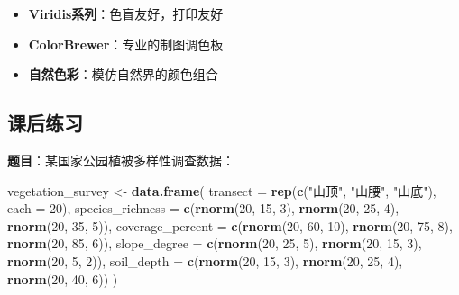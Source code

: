 \documentclass[
  twoside]{book}
\newenvironment{Shaded}{\begin{snugshade}}{\end{snugshade}}
\newcommand{\AttributeTok}[1]{\textcolor[rgb]{0.13,0.29,0.53}{#1}}
\newcommand{\DecValTok}[1]{\textcolor[rgb]{0.00,0.00,0.81}{#1}}
\newcommand{\FunctionTok}[1]{\textcolor[rgb]{0.13,0.29,0.53}{\textbf{#1}}}
\newcommand{\NormalTok}[1]{#1}
\newcommand{\OtherTok}[1]{\textcolor[rgb]{0.56,0.35,0.01}{#1}}
\newcommand{\StringTok}[1]{\textcolor[rgb]{0.31,0.60,0.02}{#1}}
\providecommand{\tightlist}{%
  \setlength{\itemsep}{0pt}\setlength{\parskip}{0pt}}
\begin{document}
\begin{itemize}
\tightlist
\item
  \textbf{Viridis系列}：色盲友好，打印友好
\item
  \textbf{ColorBrewer}：专业的制图调色板
\item
  \textbf{自然色彩}：模仿自然界的颜色组合
\end{itemize}

\hypertarget{ux8bfeux540eux7ec3ux4e60-9}{%
\subsection{课后练习}\label{ux8bfeux540eux7ec3ux4e60-9}}

\textbf{题目}：某国家公园植被多样性调查数据：

\begin{Shaded}
\begin{Highlighting}[]
\NormalTok{vegetation\_survey }\OtherTok{\textless{}{-}} \FunctionTok{data.frame}\NormalTok{(}
  \AttributeTok{transect =} \FunctionTok{rep}\NormalTok{(}\FunctionTok{c}\NormalTok{(}\StringTok{"山顶"}\NormalTok{, }\StringTok{"山腰"}\NormalTok{, }\StringTok{"山底"}\NormalTok{), }\AttributeTok{each =} \DecValTok{20}\NormalTok{),}
  \AttributeTok{species\_richness =} \FunctionTok{c}\NormalTok{(}\FunctionTok{rnorm}\NormalTok{(}\DecValTok{20}\NormalTok{, }\DecValTok{15}\NormalTok{, }\DecValTok{3}\NormalTok{), }\FunctionTok{rnorm}\NormalTok{(}\DecValTok{20}\NormalTok{, }\DecValTok{25}\NormalTok{, }\DecValTok{4}\NormalTok{), }\FunctionTok{rnorm}\NormalTok{(}\DecValTok{20}\NormalTok{, }\DecValTok{35}\NormalTok{, }\DecValTok{5}\NormalTok{)),}
  \AttributeTok{coverage\_percent =} \FunctionTok{c}\NormalTok{(}\FunctionTok{rnorm}\NormalTok{(}\DecValTok{20}\NormalTok{, }\DecValTok{60}\NormalTok{, }\DecValTok{10}\NormalTok{), }\FunctionTok{rnorm}\NormalTok{(}\DecValTok{20}\NormalTok{, }\DecValTok{75}\NormalTok{, }\DecValTok{8}\NormalTok{), }\FunctionTok{rnorm}\NormalTok{(}\DecValTok{20}\NormalTok{, }\DecValTok{85}\NormalTok{, }\DecValTok{6}\NormalTok{)),}
  \AttributeTok{slope\_degree =} \FunctionTok{c}\NormalTok{(}\FunctionTok{rnorm}\NormalTok{(}\DecValTok{20}\NormalTok{, }\DecValTok{25}\NormalTok{, }\DecValTok{5}\NormalTok{), }\FunctionTok{rnorm}\NormalTok{(}\DecValTok{20}\NormalTok{, }\DecValTok{15}\NormalTok{, }\DecValTok{3}\NormalTok{), }\FunctionTok{rnorm}\NormalTok{(}\DecValTok{20}\NormalTok{, }\DecValTok{5}\NormalTok{, }\DecValTok{2}\NormalTok{)),}
  \AttributeTok{soil\_depth =} \FunctionTok{c}\NormalTok{(}\FunctionTok{rnorm}\NormalTok{(}\DecValTok{20}\NormalTok{, }\DecValTok{15}\NormalTok{, }\DecValTok{3}\NormalTok{), }\FunctionTok{rnorm}\NormalTok{(}\DecValTok{20}\NormalTok{, }\DecValTok{25}\NormalTok{, }\DecValTok{4}\NormalTok{), }\FunctionTok{rnorm}\NormalTok{(}\DecValTok{20}\NormalTok{, }\DecValTok{40}\NormalTok{, }\DecValTok{6}\NormalTok{))}
\NormalTok{)}
\end{Highlighting}
\end{Shaded}
\end{document}
